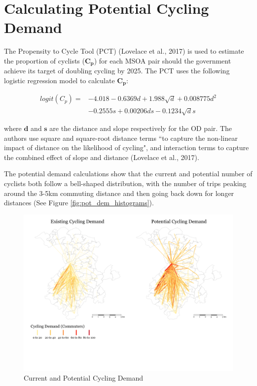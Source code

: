 \documentclass[
]{article}
\begin{document}
\hypertarget{calculating-potential-cycling-demand}{%
\section{Calculating Potential Cycling
Demand}\label{calculating-potential-cycling-demand}}

The Propensity to Cycle Tool (PCT) (Lovelace et al., 2017) is used to
estimate the proportion of cyclists (\(\boldsymbol{C_{p}}\)) for each
MSOA pair should the government achieve its target of doubling cycling
by 2025. The PCT uses the following logistic regression model to
calculate \(\boldsymbol{C_{p}}\):

\begin{align}\label{eq:pcteqn}
     logit(C_{p}) = & -4.018 - 0.6369d +  1.988\sqrt{d} + 0.008775d^2\\ & - 0.2555s + 0.00206ds -0.1234\sqrt{d}s\nonumber 
\end{align}

\noindent where \(\boldsymbol{d}\) and \(\boldsymbol{s}\) are the
distance and slope respectively for the OD pair. The authors use square
and square-root distance terms ``to capture the non-linear impact of
distance on the likelihood of cycling", and interaction terms to capture
the combined effect of slope and distance (Lovelace et al., 2017).

The potential demand calculations show that the current and potential
number of cyclists both follow a bell-shaped distribution, with the
number of trips peaking around the 3-5km commuting distance and then
going back down for longer distances (See Figure
\ref{fig:pot_dem_histograms}).

\begin{figure}[h!]
    \centering %
    \includegraphics[width=.6\textwidth]{../../data/Manchester/Plots/desire_facet_cycling.png} 
    \caption{Current and Potential Cycling Demand} 
    \label{fig:desire_facet_cycling} 
\end{figure}
\end{document}
